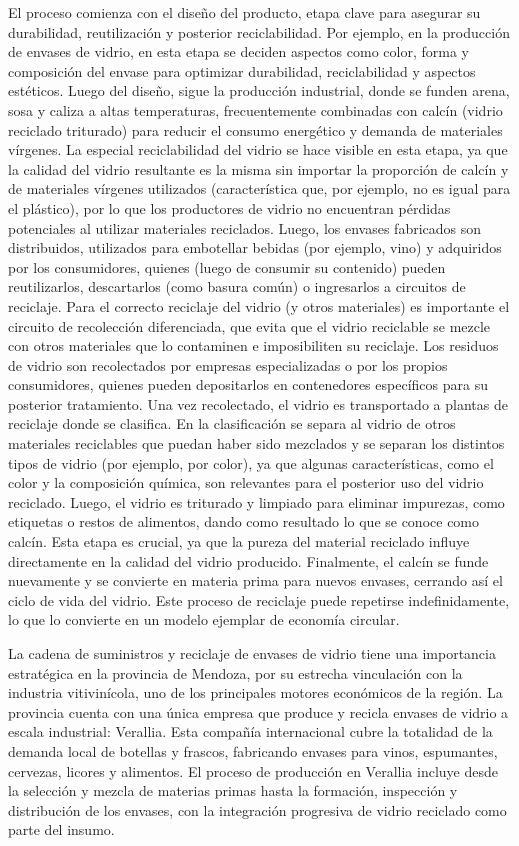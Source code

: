 El proceso comienza con el diseño del producto, etapa clave para asegurar su durabilidad, reutilización y posterior reciclabilidad. Por ejemplo, en la producción de envases de vidrio, en esta etapa se deciden aspectos como color, forma y composición del envase para optimizar durabilidad, reciclabilidad y aspectos estéticos. Luego del diseño, sigue la producción industrial, donde se funden arena, sosa y caliza a altas temperaturas, frecuentemente combinadas con calcín (vidrio reciclado triturado) para reducir el consumo energético y demanda de materiales vírgenes. La especial reciclabilidad del vidrio se hace visible en esta etapa, ya que la calidad del vidrio resultante es la misma sin importar la proporción de calcín y de materiales vírgenes utilizados (característica que, por ejemplo, no es igual para el plástico), por lo que los productores de vidrio no encuentran pérdidas potenciales al utilizar materiales reciclados. Luego, los envases fabricados son distribuidos, utilizados para embotellar bebidas (por ejemplo, vino) y adquiridos por los consumidores, quienes (luego de consumir su contenido) pueden reutilizarlos, descartarlos (como basura común) o ingresarlos a circuitos de reciclaje. Para el correcto reciclaje del vidrio (y otros materiales) es importante el circuito de recolección diferenciada, que evita que el vidrio reciclable se mezcle con otros materiales que lo contaminen e imposibiliten su reciclaje. Los residuos de vidrio son recolectados por empresas especializadas o por los propios consumidores, quienes pueden depositarlos en contenedores específicos para su posterior tratamiento.
Una vez recolectado, el vidrio es transportado a plantas de reciclaje donde se clasifica. En la clasificación se separa al vidrio de otros materiales reciclables que puedan haber sido mezclados y se separan los distintos tipos de vidrio (por ejemplo, por color), ya que algunas características, como el color y la composición química, son relevantes para el posterior uso del vidrio reciclado. Luego, el vidrio es triturado y limpiado para eliminar impurezas, como etiquetas o restos de alimentos, dando como resultado lo que se conoce como calcín. Esta etapa es crucial, ya que la pureza del material reciclado influye directamente en la calidad del vidrio producido. Finalmente, el calcín se funde nuevamente y se convierte en materia prima para nuevos envases, cerrando así el ciclo de vida del vidrio. Este proceso de reciclaje puede repetirse indefinidamente, lo que lo convierte en un modelo ejemplar de economía circular.

La cadena de suministros y reciclaje de envases de vidrio tiene una importancia estratégica en la provincia de Mendoza, por su estrecha vinculación con la industria vitivinícola, uno de los principales motores económicos de la región. La provincia cuenta con una única empresa que produce y recicla envases de vidrio a escala industrial: Verallia. Esta compañía internacional cubre la totalidad de la demanda local de botellas y frascos, fabricando envases para vinos, espumantes, cervezas, licores y alimentos. El proceso de producción en Verallia incluye desde la selección y mezcla de materias primas hasta la formación, inspección y distribución de los envases, con la integración progresiva de vidrio reciclado como parte del insumo.

